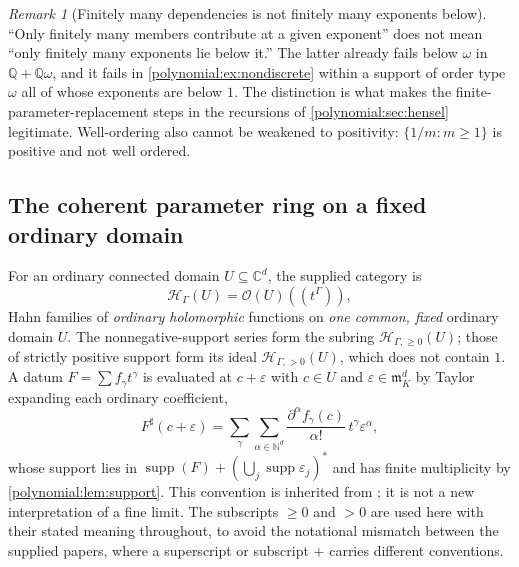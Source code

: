 \documentclass[11pt,letterpaper]{article}
\numberwithin{equation}{section}
\theoremstyle{definition}
\theoremstyle{remark}\newtheorem{remark}[theorem]{Remark}
\newcommand{\C}{\mathbb C}
\newcommand{\N}{\mathbb N}
\newcommand{\Q}{\mathbb Q}
\newcommand{\OO}{\mathcal O}
\newcommand{\mm}{\mathfrak m}
\newcommand{\HH}{\mathscr H_\Gamma}
\newcommand{\HHp}{\mathscr H_{\Gamma,>0}}
\newcommand{\HHn}{\mathscr H_{\Gamma,\ge0}}
\newcommand{\supp}{\operatorname{supp}}
\newcommand{\sh}{^{\sharp}}
\begin{document}
\begin{remark}[Finitely many dependencies is not finitely many exponents
below]\label{polynomial:rem:belowbound}
``Only finitely many members contribute at a given exponent'' does not mean
``only finitely many exponents lie below it.'' The latter already fails below
$\omega$ in $\Q+\Q\omega$, and it fails in
\cref{polynomial:ex:nondiscrete} within a support of order type $\omega$ all
of whose exponents are below $1$. The distinction is what makes the
finite-parameter-replacement steps in the recursions of
\cref{polynomial:sec:hensel} legitimate. Well-ordering also cannot be weakened
to positivity: $\{1/m:m\ge1\}$ is positive and not well ordered.
\end{remark}

\subsection{The coherent parameter ring on a fixed ordinary domain}
\label{polynomial:subsec:coherentring}
For an ordinary connected domain $U\subseteq\C^d$, the supplied category is
\[
 \HH(U)=\OO(U)((t^\Gamma)),
\]
Hahn families of \emph{ordinary holomorphic} functions on \emph{one common,
fixed} ordinary domain $U$. The nonnegative-support series form the subring
$\HHn(U)$; those of strictly positive support form its ideal $\HHp(U)$,
which does not contain $1$. A datum $F=\sum f_\gamma t^\gamma$ is evaluated
at $c+\varepsilon$ with $c\in U$ and $\varepsilon\in\mm_K^d$ by Taylor
expanding each ordinary coefficient,
\begin{equation}\label{polynomial:eq:coherentevaluation}
 F\sh(c+\varepsilon)=\sum_\gamma\sum_{\alpha\in\N^d}
 \frac{\partial^\alpha f_\gamma(c)}{\alpha!}\,t^\gamma\varepsilon^\alpha ,
\end{equation}
whose support lies in $\supp(F)+(\bigcup_j\supp\varepsilon_j)^*$ and has
finite multiplicity by \cref{polynomial:lem:support}. This convention is
inherited from
\cite{polynomial:SourceAnalysis,polynomial:SourceResearch}; it is not a new
interpretation of a fine limit. The subscripts $\ge0$ and $>0$ are used here
with their stated meaning throughout, to avoid the notational mismatch between
the supplied papers, where a superscript or subscript $+$ carries different
conventions.
\end{document}
